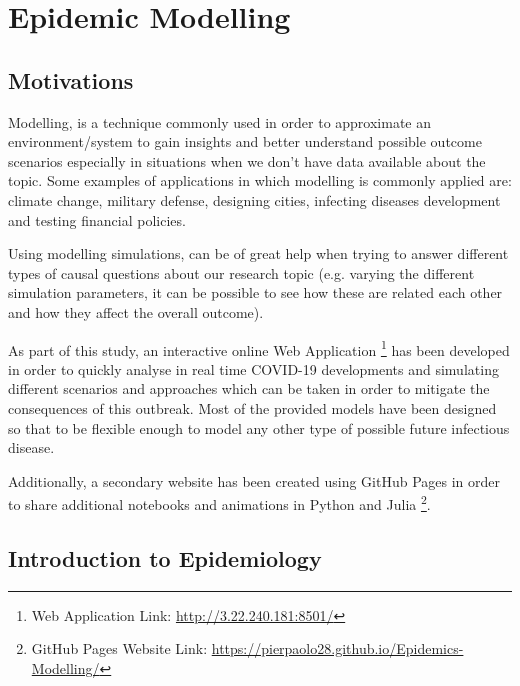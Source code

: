 \chapter{Epidemic Modelling}
\label{ch:progress}

\section{Motivations}
Modelling, is a technique commonly used in order to approximate an environment/system to gain insights and better understand possible outcome scenarios especially in situations when we don't have data available about the topic. Some examples of applications in which modelling is commonly applied are: climate change, military defense, designing cities, infecting diseases development and testing financial policies. 

Using modelling simulations, can be of great help when trying to answer different types of causal questions about our research topic (e.g. varying the different simulation parameters, it can be possible to see how these are related each other and how they affect the overall outcome). 

As part of this study, an interactive online Web Application \footnote{Web Application Link: \url{http://3.22.240.181:8501/}} has been developed in order to quickly analyse in real time COVID-19 developments and simulating different scenarios and approaches which can be taken in order to mitigate the consequences of this outbreak. Most of the provided models have been designed so that to be flexible enough to model any other type of possible future infectious disease. 

Additionally, a secondary website has been created using GitHub Pages in order to share additional notebooks and animations in Python and Julia \footnote{GitHub Pages Website Link: \url{https://pierpaolo28.github.io/Epidemics-Modelling/}}. 

\section{Introduction to Epidemiology}

